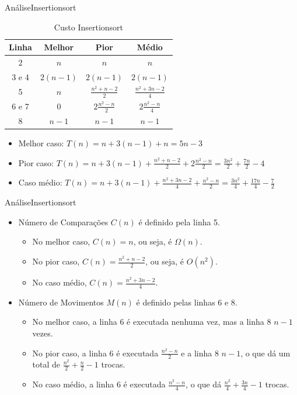 \documentclass[aspectratio=169]{beamer}
\begin{document}
\begin{frame}[fragile]{Análise}{Insertionsort}
\begin{table}[]
\centering
\caption{Custo Insertionsort}
\label{Custo Bubblesort}
\begin{tabular}{c|ccc}
Linha  &  Melhor  &  Pior  &  Médio  \\
\hline
2       & $n$  & $n$  &  $n$ \\
3 e 4   & $2(n-1)$  & $2(n-1)$  &  $2(n-1)$ \\
5       & $n$  & $\frac{n^2+n-2}{2}$  &  $\frac{n^2+3n-2}{4}$ \\
6 e 7   & 0  & $2\frac{n^2-n}{2}$  & $2\frac{n^2-n}{4}$ \\
8       & $n-1$  & $n-1$  &  $n-1$ \\
\end{tabular}
\end{table}

\begin{itemize}
 \item Melhor caso: $T(n) = n + 3(n-1) + n = 5n -3$
 \item Pior caso: $T(n) = n + 3(n-1) + \frac{n^2+n-2}{2} + 2\frac{n^2-n}{2} = \frac{3n^2}{2} + \frac{7n}{2} - 4$
 \item Caso médio: $T(n) = n + 3(n-1) + \frac{n^2+3n-2}{4} + \frac{n^2-n}{2} = \frac{3n^2}{4} + \frac{17n}{4} - \frac{7}{2}$
\end{itemize}
\end{frame}


\begin{frame}[fragile]{Análise}{Insertionsort}
\begin{itemize}
 \item Número de Comparações $C(n)$ é definido pela linha 5.
 \begin{itemize}
 \item No melhor caso, $C(n) = n$, ou seja, é $\Omega(n)$.
 \item No pior caso, $C(n) = \frac{n^2+n-2}{2}$, ou seja, é $O(n^2)$.
 \item No caso médio, $C(n) = \frac{n^2+3n-2}{4}$.
 \end{itemize}
\item Número de Movimentos $M(n)$ é definido pelas linhas 6 e 8.
 \begin{itemize}
 \item No melhor caso, a linha 6 é executada nenhuma vez, mas a linha 8 $n-1$ vezes.
 \item No pior caso, a linha 6 é executada $\frac{n^2-n}{2}$ e a linha 8 $n-1$, o que dá um total de $\frac{n^2}{2} + \frac{n}{2} - 1$ trocas.
 \item No caso médio, a linha 6 é executada $\frac{n^2-n}{4}$, o que dá $\frac{n^2}{4} + \frac{3n}{4} - 1$ trocas.
 \end{itemize} 
\end{itemize}
\end{frame}
\end{document}
